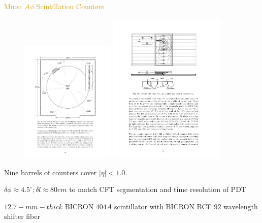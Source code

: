 \begin{frame}{\textcolor{Goldenrod}{Muon $A\phi$ Scintillation Counters}}
  \begin{overlayarea}{\textwidth}{\textheight}
    \begin{figure}[h]
      \centering
      \includegraphics[height=0.4\textheight, width=0.4\textwidth]{./Images/46_MD_Scint_01.pdf}
      \includegraphics[height=0.4\textheight, width=0.5\textwidth]{./Images/46_MD_Scint_02.pdf}
    \end{figure}
    \itt

  \item
    Nine barrels of counters cover $|\eta| < 1.0$.

    
  \item
    \alert{$\delta \phi \approx 4.5^{\circ}; \delta l \approx 80 cm$
      to match CFT segmentation and time resolution of PDT}
  \item
    $12.7-mm-thick$ BICRON $404A$ scintillator with BICRON BCF $92$
    wavelength shifter fiber
    

\end{overlayarea}
\end{frame}
